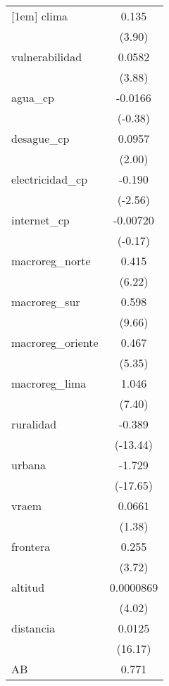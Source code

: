 {\begin{tabular}{l*{1}{c}}
[1em]
clima       &       0.135\sym{***}\\
            &      (3.90)         \\
[1em]
vulnerabilidad&      0.0582\sym{***}\\
            &      (3.88)         \\
[1em]
agua\_cp     &     -0.0166         \\
            &     (-0.38)         \\
[1em]
desague\_cp  &      0.0957\sym{*}  \\
            &      (2.00)         \\
[1em]
electricidad\_cp&      -0.190\sym{*}  \\
            &     (-2.56)         \\
[1em]
internet\_cp &    -0.00720         \\
            &     (-0.17)         \\
[1em]
macroreg\_norte&       0.415\sym{***}\\
            &      (6.22)         \\
[1em]
macroreg\_sur&       0.598\sym{***}\\
            &      (9.66)         \\
[1em]
macroreg\_oriente&       0.467\sym{***}\\
            &      (5.35)         \\
[1em]
macroreg\_lima&       1.046\sym{***}\\
            &      (7.40)         \\
[1em]
ruralidad   &      -0.389\sym{***}\\
            &    (-13.44)         \\
[1em]
urbana      &      -1.729\sym{***}\\
            &    (-17.65)         \\
[1em]
vraem       &      0.0661         \\
            &      (1.38)         \\
[1em]
frontera    &       0.255\sym{***}\\
            &      (3.72)         \\
[1em]
altitud     &   0.0000869\sym{***}\\
            &      (4.02)         \\
[1em]
distancia   &      0.0125\sym{***}\\
            &     (16.17)         \\
[1em]
AB          &       0.771\sym{*}  \\

\end{tabular}}
